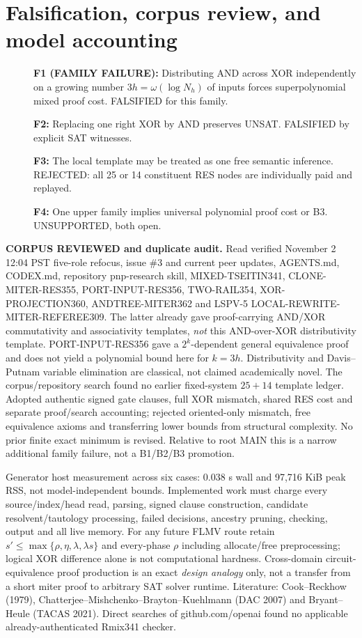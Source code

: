 \documentclass[11pt]{article}
\begin{document}
\section*{Falsification, corpus review, and model accounting}
\begin{description}
\item[]\textbf{F1 (FAMILY FAILURE):} Distributing AND across XOR independently on a growing number $3h=\omega(\log N_h)$ of inputs forces superpolynomial mixed proof cost. FALSIFIED for this family.
\item[]\textbf{F2:} Replacing one right XOR by AND preserves UNSAT. FALSIFIED by explicit SAT witnesses.
\item[]\textbf{F3:} The local template may be treated as one free semantic inference. REJECTED: all 25 or 14 constituent RES nodes are individually paid and replayed.
\item[]\textbf{F4:} One upper family implies universal polynomial proof cost or B3. UNSUPPORTED, both open.
\end{description}
\noindent\textbf{CORPUS REVIEWED and duplicate audit.} Read verified November 2 12:04 PST five-role refocus, issue \#3 and current peer updates, AGENTS.md, CODEX.md, repository pnp-research skill, MIXED-TSEITIN341, CLONE-MITER-RES355, PORT-INPUT-RES356, TWO-RAIL354, XOR-PROJECTION360, ANDTREE-MITER362 and LSPV-5 LOCAL-REWRITE-MITER-REFEREE309. The latter already gave proof-carrying AND/XOR commutativity and associativity templates, \emph{not} this AND-over-XOR distributivity template. PORT-INPUT-RES356 gave a $2^k$-dependent general equivalence proof and does not yield a polynomial bound here for $k=3h$. Distributivity and Davis--Putnam variable elimination are classical, not claimed academically novel. The corpus/repository search found no earlier fixed-system $25+14$ template ledger. Adopted authentic signed gate clauses, full XOR mismatch, shared RES cost and separate proof/search accounting; rejected oriented-only mismatch, free equivalence axioms and transferring lower bounds from structural complexity. No prior finite exact minimum is revised. Relative to root MAIN this is a narrow additional family failure, not a B1/B2/B3 promotion.

Generator host measurement across six cases: 0.038 s wall and 97,716 KiB peak RSS, not model-independent bounds. Implemented work must charge every source/index/head read, parsing, signed clause construction, candidate resolvent/tautology processing, failed decisions, ancestry pruning, checking, output and all live memory. For any future FLMV route retain $s'\le\max\{\rho,\eta,\lambda,\lambda s\}$ and every-phase $\rho$ including allocate/free preprocessing; logical XOR difference alone is not computational hardness. Cross-domain circuit-equivalence proof production is an exact \emph{design analogy} only, not a transfer from a short miter proof to arbitrary SAT solver runtime. Literature: Cook--Reckhow (1979), Chatterjee--Mishchenko--Brayton--Kuehlmann (DAC 2007) and Bryant--Heule (TACAS 2021). Direct searches of github.com/openai found no applicable already-authenticated Rmix341 checker.
\end{document}
